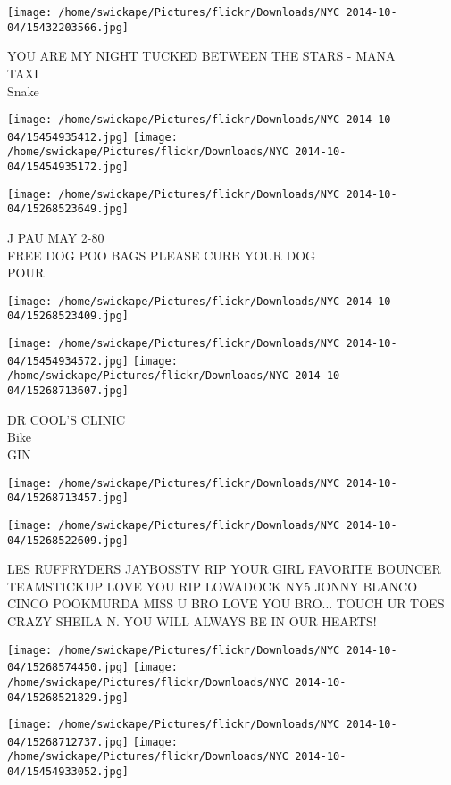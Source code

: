 \documentclass[10pt,letterpaper]{article}
\begin{document}
\vspace{0.25in}
\texttt{[image: /home/swickape/Pictures/flickr/Downloads/NYC 2014-10-04/15432203566.jpg]}

YOU ARE MY NIGHT TUCKED BETWEEN THE STARS {-} MANA\\
TAXI\\
Snake
\pagebreak

\texttt{[image: /home/swickape/Pictures/flickr/Downloads/NYC 2014-10-04/15454935412.jpg]}
\texttt{[image: /home/swickape/Pictures/flickr/Downloads/NYC 2014-10-04/15454935172.jpg]}

\texttt{[image: /home/swickape/Pictures/flickr/Downloads/NYC 2014-10-04/15268523649.jpg]}

J PAU MAY 2{-}80\\
FREE DOG POO BAGS PLEASE CURB YOUR DOG\\
POUR
\pagebreak

\texttt{[image: /home/swickape/Pictures/flickr/Downloads/NYC 2014-10-04/15268523409.jpg]}

\vspace{0.25in}
\texttt{[image: /home/swickape/Pictures/flickr/Downloads/NYC 2014-10-04/15454934572.jpg]}
\texttt{[image: /home/swickape/Pictures/flickr/Downloads/NYC 2014-10-04/15268713607.jpg]}

DR COOL'S CLINIC\\
Bike\\
GIN
\pagebreak

\texttt{[image: /home/swickape/Pictures/flickr/Downloads/NYC 2014-10-04/15268713457.jpg]}

\vspace{0.25in}
\texttt{[image: /home/swickape/Pictures/flickr/Downloads/NYC 2014-10-04/15268522609.jpg]}

LES RUFFRYDERS JAYBOSSTV RIP YOUR GIRL FAVORITE BOUNCER TEAMSTICKUP LOVE YOU RIP LOWADOCK NY5 JONNY BLANCO CINCO POOKMURDA MISS U BRO LOVE YOU BRO... TOUCH UR TOES\\
CRAZY SHEILA N. YOU WILL ALWAYS BE IN OUR HEARTS!
\pagebreak

\texttt{[image: /home/swickape/Pictures/flickr/Downloads/NYC 2014-10-04/15268574450.jpg]}
\texttt{[image: /home/swickape/Pictures/flickr/Downloads/NYC 2014-10-04/15268521829.jpg]}

\texttt{[image: /home/swickape/Pictures/flickr/Downloads/NYC 2014-10-04/15268712737.jpg]}
\texttt{[image: /home/swickape/Pictures/flickr/Downloads/NYC 2014-10-04/15454933052.jpg]}
\end{document}
